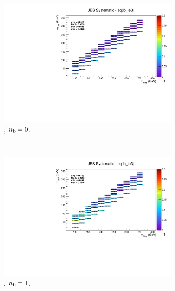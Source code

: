 \begin{figure}[ht!]
\begin{subfigure}[b]{0.32\textwidth}
    \includegraphics[width=\textwidth, page=1]{Figs/sms/t2cc/v37_2/systs/T2cc_JES_eq0b_le3j.pdf}
    \caption{\njlow, $n_{\text{b}} = 0$.}
    \label{fig:sms-jes-t2cc-le3j-0b}
  \end{subfigure}\\
  \begin{subfigure}[b]{0.32\textwidth}
    \includegraphics[width=\textwidth, page=12]{Figs/sms/t2cc/v37_2/systs/T2cc_JES_eq1b_le3j.pdf}
    \caption{\njlow, $n_{\text{b}} = 1$.}
  \end{subfigure}
  \begin{subfigure}[b]{0.32\textwidth}

\end{subfigure}
\end{figure}
